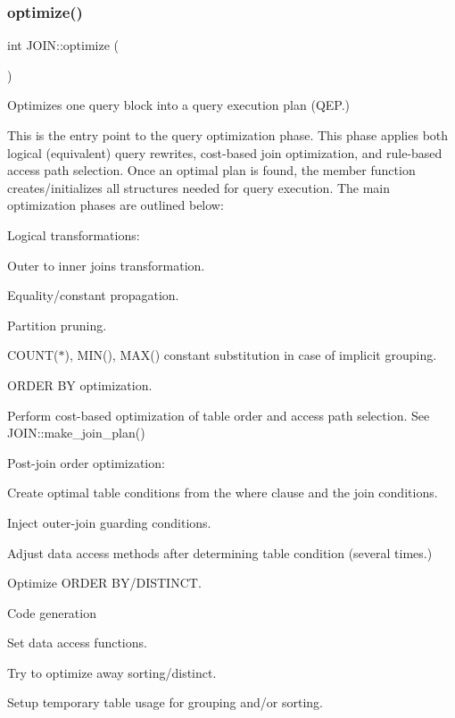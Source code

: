 \subsubsection{\texorpdfstring{optimize()}{optimize()}}
{\footnotesize\ttfamily int J\+O\+I\+N\+::optimize (\begin{DoxyParamCaption}{ }\end{DoxyParamCaption})}

Optimizes one query block into a query execution plan (Q\+EP.)

This is the entry point to the query optimization phase. This phase applies both logical (equivalent) query rewrites, cost-\/based join optimization, and rule-\/based access path selection. Once an optimal plan is found, the member function creates/initializes all structures needed for query execution. The main optimization phases are outlined below\+:


\begin{DoxyEnumerate}
\item Logical transformations\+:
\begin{DoxyItemize}
\item Outer to inner joins transformation.
\item Equality/constant propagation.
\item Partition pruning.
\item C\+O\+U\+N\+T($\ast$), M\+I\+N(), M\+A\+X() constant substitution in case of implicit grouping.
\item O\+R\+D\+ER BY optimization.
\end{DoxyItemize}
\item Perform cost-\/based optimization of table order and access path selection. See J\+O\+I\+N\+::make\+\_\+join\+\_\+plan()
\item Post-\/join order optimization\+:
\begin{DoxyItemize}
\item Create optimal table conditions from the where clause and the join conditions.
\item Inject outer-\/join guarding conditions.
\item Adjust data access methods after determining table condition (several times.)
\item Optimize O\+R\+D\+ER B\+Y/\+D\+I\+S\+T\+I\+N\+CT.
\end{DoxyItemize}
\item Code generation
\begin{DoxyItemize}
\item Set data access functions.
\item Try to optimize away sorting/distinct.
\item Setup temporary table usage for grouping and/or sorting.
\end{DoxyItemize}
\end{DoxyEnumerate}


